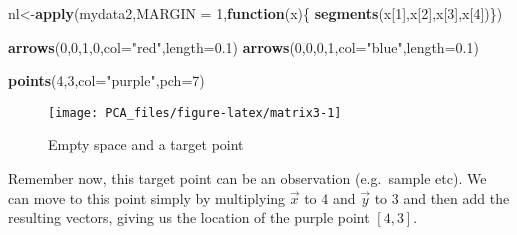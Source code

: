 \documentclass[
]{book}
\newenvironment{Shaded}{\begin{snugshade}}{\end{snugshade}}
\newcommand{\ControlFlowTok}[1]{\textcolor[rgb]{0.13,0.29,0.53}{\textbf{#1}}}
\newcommand{\DataTypeTok}[1]{\textcolor[rgb]{0.13,0.29,0.53}{#1}}
\newcommand{\DecValTok}[1]{\textcolor[rgb]{0.00,0.00,0.81}{#1}}
\newcommand{\FloatTok}[1]{\textcolor[rgb]{0.00,0.00,0.81}{#1}}
\newcommand{\KeywordTok}[1]{\textcolor[rgb]{0.13,0.29,0.53}{\textbf{#1}}}
\newcommand{\NormalTok}[1]{#1}
\newcommand{\StringTok}[1]{\textcolor[rgb]{0.31,0.60,0.02}{#1}}
\theoremstyle{definition}
\theoremstyle{definition}
\theoremstyle{definition}
\theoremstyle{remark}
\begin{document}
\begin{Shaded}
\begin{Highlighting}[]
\NormalTok{nl<-}\KeywordTok{apply}\NormalTok{(mydata2,}\DataTypeTok{MARGIN =} \DecValTok{1}\NormalTok{,}\ControlFlowTok{function}\NormalTok{(x)\{}
  \KeywordTok{segments}\NormalTok{(x[}\DecValTok{1}\NormalTok{],x[}\DecValTok{2}\NormalTok{],x[}\DecValTok{3}\NormalTok{],x[}\DecValTok{4}\NormalTok{])\})}


\KeywordTok{arrows}\NormalTok{(}\DecValTok{0}\NormalTok{,}\DecValTok{0}\NormalTok{,}\DecValTok{1}\NormalTok{,}\DecValTok{0}\NormalTok{,}\DataTypeTok{col=}\StringTok{"red"}\NormalTok{,}\DataTypeTok{length=}\FloatTok{0.1}\NormalTok{)}
\KeywordTok{arrows}\NormalTok{(}\DecValTok{0}\NormalTok{,}\DecValTok{0}\NormalTok{,}\DecValTok{0}\NormalTok{,}\DecValTok{1}\NormalTok{,}\DataTypeTok{col=}\StringTok{"blue"}\NormalTok{,}\DataTypeTok{length=}\FloatTok{0.1}\NormalTok{)}

\KeywordTok{points}\NormalTok{(}\DecValTok{4}\NormalTok{,}\DecValTok{3}\NormalTok{,}\DataTypeTok{col=}\StringTok{"purple"}\NormalTok{,}\DataTypeTok{pch=}\DecValTok{7}\NormalTok{)}
\end{Highlighting}
\end{Shaded}

\begin{figure}

{\centering \texttt{[image: PCA\_files/figure-latex/matrix3-1]} 

}

\caption{Empty space and a target point}\label{fig:matrix3}
\end{figure}

Remember now, this target point can be an observation (e.g.~sample etc). We can move to this point simply by multiplying \(\vec{x}\) to 4 and \(\vec{y}\) to 3 and then add the resulting vectors, giving us the location of the purple point \([4,3]\).
\end{document}
